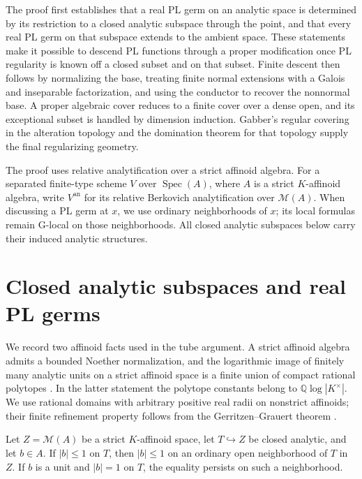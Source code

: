 \documentclass[11pt,a4paper]{amsart}
\begin{document}
The proof first establishes that a real PL germ on an analytic space is determined by its restriction to a closed analytic subspace through the point, and that every real PL germ on that subspace extends to the ambient space. These statements make it possible to descend PL functions through a proper modification once PL regularity is known off a closed subset and on that subset. Finite descent then follows by normalizing the base, treating finite normal extensions with a Galois and inseparable factorization, and using the conductor to recover the nonnormal base. A proper algebraic cover reduces to a finite cover over a dense open, and its exceptional subset is handled by dimension induction. Gabber's regular covering in the alteration topology and the domination theorem for that topology \cite[Expos\'{e}~VII, Th\'{e}or\`{e}me~1.1; Expos\'{e}~II, Th\'{e}or\`{e}me~3.2.1]{ILO14} supply the final regularizing geometry.

The proof uses relative analytification over a strict affinoid algebra. For a separated finite-type scheme $V$ over $\operatorname{Spec}(A)$, where $A$ is a strict $K$-affinoid algebra, write $V^{\mathrm{an}}$ for its relative Berkovich analytification over $\mathcal M(A)$. When discussing a PL germ at $x$, we use ordinary neighborhoods of $x$; its local formulas remain G-local on those neighborhoods. All closed analytic subspaces below carry their induced analytic structures.

\section{Closed analytic subspaces and real PL germs}\label{sec:closed-subspaces}

We record two affinoid facts used in the tube argument. A strict affinoid algebra admits a bounded Noether normalization, and the logarithmic image of finitely many analytic units on a strict affinoid space is a finite union of compact rational polytopes \cite[\S6.1]{BGR84}\cite[Theorem~A]{Ducros12Polytopes}. In the latter statement the polytope constants belong to $\mathbb Q\log|K^\times|$. We use rational domains with arbitrary positive real radii on nonstrict affinoids; their finite refinement property follows from the Gerritzen--Grauert theorem \cite{Temkin05GG}.

\begin{lemma}\label{lem:unit-norm-tube}
Let $Z=\mathcal M(A)$ be a strict $K$-affinoid space, let $T\hookrightarrow Z$ be closed analytic, and let $b\in A$. If $|b|\leq1$ on $T$, then $|b|\leq1$ on an ordinary open neighborhood of $T$ in $Z$. If $b$ is a unit and $|b|=1$ on $T$, the equality persists on such a neighborhood.
\end{lemma}
\end{document}

